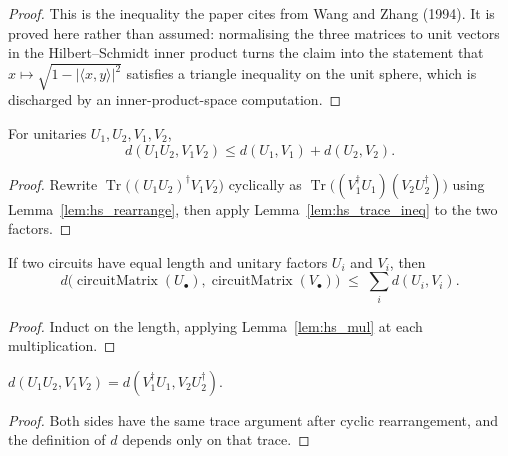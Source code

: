 \begin{proof}
  \leanok
  This is the inequality the paper cites from Wang and Zhang (1994).  It is
  proved here rather than assumed: normalising the three matrices to unit
  vectors in the Hilbert--Schmidt inner product turns the claim into the
  statement that $x \mapsto \sqrt{1 - \lvert\langle x, y\rangle\rvert^2}$
  satisfies a triangle inequality on the unit sphere, which is discharged by
  an inner-product-space computation.
\end{proof}

\begin{lemma}
  \label{lem:hs_mul}
  \leanok
  For unitaries $U_1, U_2, V_1, V_2$,
  \[
    d(U_1 U_2, V_1 V_2) \le d(U_1, V_1) + d(U_2, V_2).
  \]
\end{lemma}

\begin{proof}
  \leanok
  Rewrite $\operatorname{Tr}\!\big((U_1U_2)^\dagger V_1 V_2\big)$ cyclically as
  $\operatorname{Tr}\!\big((V_1^\dagger U_1)(V_2 U_2^\dagger)\big)$ using
  Lemma~\ref{lem:hs_rearrange}, then apply
  Lemma~\ref{lem:hs_trace_ineq} to the two factors.
\end{proof}

\begin{lemma}
  \label{lem:hs_circuit_sum}
  \leanok
  If two circuits have equal length and unitary factors $U_i$ and $V_i$, then
  \[
    d\big(\operatorname{circuitMatrix}(U_\bullet),
          \operatorname{circuitMatrix}(V_\bullet)\big)
      \;\le\; \sum_i d(U_i, V_i).
  \]
\end{lemma}

\begin{proof}
  \leanok
  Induct on the length, applying Lemma~\ref{lem:hs_mul} at each
  multiplication.
\end{proof}

\begin{lemma}
  \label{lem:hs_rearrange}
  \leanok
  $d(U_1 U_2, V_1 V_2) = d(V_1^\dagger U_1, V_2 U_2^\dagger)$.
\end{lemma}

\begin{proof}
  \leanok
  Both sides have the same trace argument after cyclic rearrangement, and the
  definition of $d$ depends only on that trace.
\end{proof}


